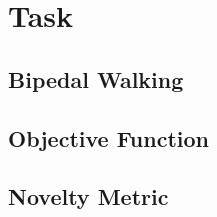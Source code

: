 \section{Task}
\subsection{Bipedal Walking}
\subsection{Objective Function}
\subsection{Novelty Metric}
